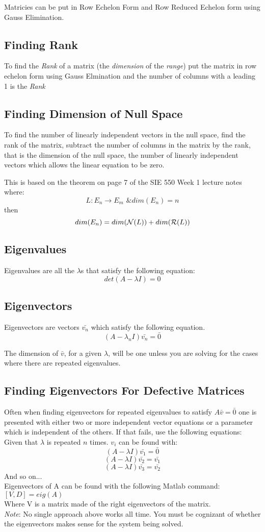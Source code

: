 \documentclass[12pt]{article}
\begin{document}
\noindent
Matricies can be put in Row Echelon Form and Row Reduced Echelon form using Gauss Elimination.

\subsection*{Finding Rank}
To find the {\em Rank} of a matrix (the {\em dimension} of the {\em range}) put the matrix in row echelon form using Gauss Elmination and the number of columns with a leading 1 is the {\em Rank}

\subsection*{Finding Dimension of Null Space}
To find the number of linearly independent vectors in the null space, find the rank of the matrix, subtract the number of columns in the matrix by the rank, that is the dimension of the null space, the number of linearly independent vectors which allows the linear equation to be zero.

This is based on the theorem on page 7 of the SIE 550 Week 1 lecture notes where:
$$L:E_n \rightarrow E_m \text{ \& } dim(E_n)=n$$
then 
$$dim(E_n)=dim({\cal N}(L))+dim({\cal R}(L))$$

\subsection*{Eigenvalues}
Eigenvalues are all the $\lambda$s that satisfy the following equation:
$$det(A-\lambda I)=0$$

\subsection*{Eigenvectors}
Eigenvectors are vectors $\bar{v_n}$ which satisfy the following equation. 
$$(A-\lambda_n I)\bar{v_n}=\bar{0}$$

\noindent
The dimension of $\bar{v}$, for a given $\lambda$, will be one unless you are solving for the cases where there are repeated eigenvalues.

\subsection*{Finding Eigenvectors For Defective Matrices}
Often when finding eigenvectors for repeated eigenvalues to satisfy $A\bar{v}=\bar{0}$ one is presented with either two or more independent vector equations or a parameter which is independent of the others. If that fails, use the following equations:
Given that $\lambda$ is repeated $n$ times. $v_i$ can be found with:
$$(A-\lambda I)\bar{v_1}=\bar{0}$$
$$(A-\lambda I)\bar{v_2}=\bar{v_1}$$
$$(A-\lambda I)\bar{v_3}=\bar{v_2}$$
And so on...\\
\noindent
Eigenvectors of A can be found with the following Matlab command:\\
$[V,D] = eig(A)$\\
Where V is a matrix made of the right eigenvectors of the matrix. \\
\noindent
{\em Note}: No single approach above works all time. You must be cognizant of whether the eigenvectors makes sense for the system being solved.
\end{document}
